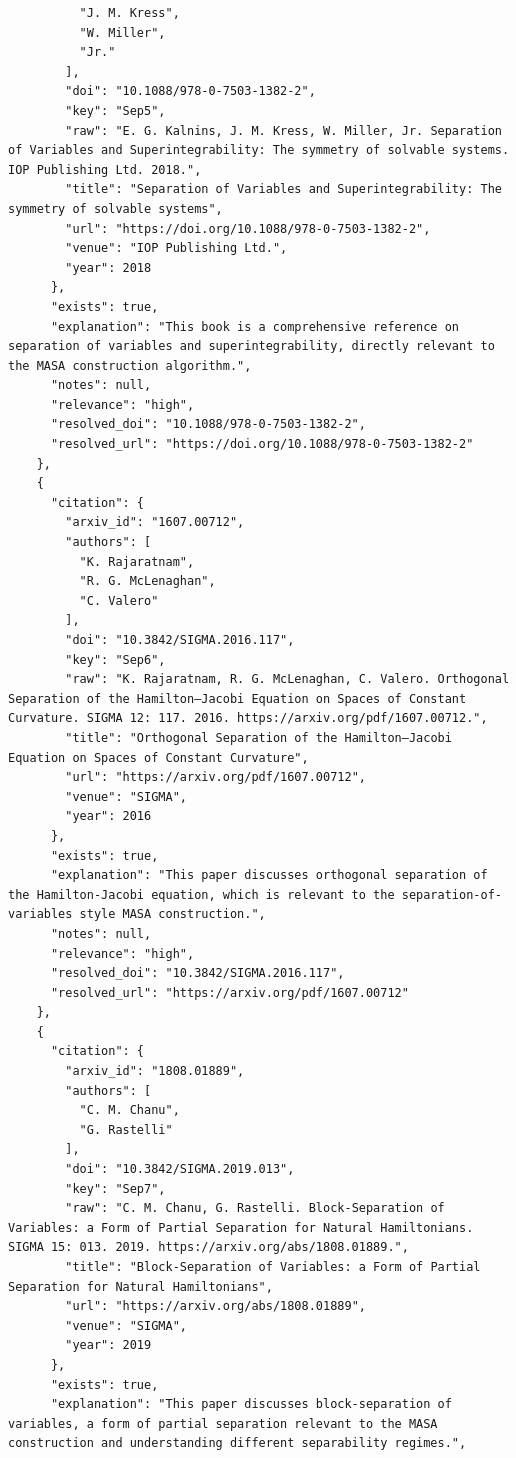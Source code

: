 \documentclass[11pt]{article}
\begin{document}
\begin{verbatim}
          "J. M. Kress",
          "W. Miller",
          "Jr."
        ],
        "doi": "10.1088/978-0-7503-1382-2",
        "key": "Sep5",
        "raw": "E. G. Kalnins, J. M. Kress, W. Miller, Jr. Separation of Variables and Superintegrability: The symmetry of solvable systems. IOP Publishing Ltd. 2018.",
        "title": "Separation of Variables and Superintegrability: The symmetry of solvable systems",
        "url": "https://doi.org/10.1088/978-0-7503-1382-2",
        "venue": "IOP Publishing Ltd.",
        "year": 2018
      },
      "exists": true,
      "explanation": "This book is a comprehensive reference on separation of variables and superintegrability, directly relevant to the MASA construction algorithm.",
      "notes": null,
      "relevance": "high",
      "resolved_doi": "10.1088/978-0-7503-1382-2",
      "resolved_url": "https://doi.org/10.1088/978-0-7503-1382-2"
    },
    {
      "citation": {
        "arxiv_id": "1607.00712",
        "authors": [
          "K. Rajaratnam",
          "R. G. McLenaghan",
          "C. Valero"
        ],
        "doi": "10.3842/SIGMA.2016.117",
        "key": "Sep6",
        "raw": "K. Rajaratnam, R. G. McLenaghan, C. Valero. Orthogonal Separation of the Hamilton–Jacobi Equation on Spaces of Constant Curvature. SIGMA 12: 117. 2016. https://arxiv.org/pdf/1607.00712.",
        "title": "Orthogonal Separation of the Hamilton–Jacobi Equation on Spaces of Constant Curvature",
        "url": "https://arxiv.org/pdf/1607.00712",
        "venue": "SIGMA",
        "year": 2016
      },
      "exists": true,
      "explanation": "This paper discusses orthogonal separation of the Hamilton-Jacobi equation, which is relevant to the separation-of-variables style MASA construction.",
      "notes": null,
      "relevance": "high",
      "resolved_doi": "10.3842/SIGMA.2016.117",
      "resolved_url": "https://arxiv.org/pdf/1607.00712"
    },
    {
      "citation": {
        "arxiv_id": "1808.01889",
        "authors": [
          "C. M. Chanu",
          "G. Rastelli"
        ],
        "doi": "10.3842/SIGMA.2019.013",
        "key": "Sep7",
        "raw": "C. M. Chanu, G. Rastelli. Block-Separation of Variables: a Form of Partial Separation for Natural Hamiltonians. SIGMA 15: 013. 2019. https://arxiv.org/abs/1808.01889.",
        "title": "Block-Separation of Variables: a Form of Partial Separation for Natural Hamiltonians",
        "url": "https://arxiv.org/abs/1808.01889",
        "venue": "SIGMA",
        "year": 2019
      },
      "exists": true,
      "explanation": "This paper discusses block-separation of variables, a form of partial separation relevant to the MASA construction and understanding different separability regimes.",

\end{verbatim}
\end{document}
